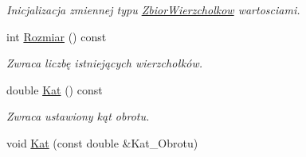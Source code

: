 \begin{DoxyCompactItemize}
\begin{DoxyCompactList}\small\item\em Inicjalizacja zmiennej typu \hyperlink{class_zbior_wierzcholkow}{Zbior\+Wierzcholkow} wartosciami. \end{DoxyCompactList}\item 
\hypertarget{class_objekt___graficzny_a23eda6cc50a9926ff066e01cf2728af8}{int \hyperlink{class_objekt___graficzny_a23eda6cc50a9926ff066e01cf2728af8}{Rozmiar} () const }\label{class_objekt___graficzny_a23eda6cc50a9926ff066e01cf2728af8}

\begin{DoxyCompactList}\small\item\em Zwraca liczbę istniejących wierzchołków. \end{DoxyCompactList}\item 
\hypertarget{class_objekt___graficzny_ac2df01dee82aa90b651f6c0f24d25796}{double \hyperlink{class_objekt___graficzny_ac2df01dee82aa90b651f6c0f24d25796}{Kat} () const }\label{class_objekt___graficzny_ac2df01dee82aa90b651f6c0f24d25796}

\begin{DoxyCompactList}\small\item\em Zwraca ustawiony kąt obrotu. \end{DoxyCompactList}\item 
\hypertarget{class_objekt___graficzny_ae2da90c757c1b9052dd8ffa692a09caf}{void \hyperlink{class_objekt___graficzny_ae2da90c757c1b9052dd8ffa692a09caf}{Kat} (const double \&Kat\+\_\+\+Obrotu)}\label{class_objekt___graficzny_ae2da90c757c1b9052dd8ffa692a09caf}


\end{DoxyCompactItemize}
